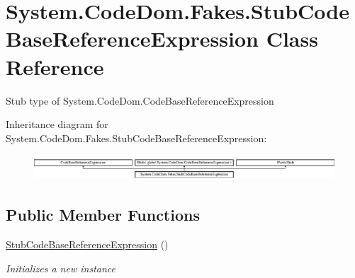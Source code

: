 \hypertarget{class_system_1_1_code_dom_1_1_fakes_1_1_stub_code_base_reference_expression}{\section{System.\-Code\-Dom.\-Fakes.\-Stub\-Code\-Base\-Reference\-Expression Class Reference}
\label{class_system_1_1_code_dom_1_1_fakes_1_1_stub_code_base_reference_expression}
}


Stub type of System.\-Code\-Dom.\-Code\-Base\-Reference\-Expression 


Inheritance diagram for System.\-Code\-Dom.\-Fakes.\-Stub\-Code\-Base\-Reference\-Expression\-:\begin{figure}[H]
\begin{center}
\leavevmode
\includegraphics[height=0.952381cm]{class_system_1_1_code_dom_1_1_fakes_1_1_stub_code_base_reference_expression}
\end{center}
\end{figure}
\subsection*{Public Member Functions}
\begin{DoxyCompactItemize}
\item 
\hyperlink{class_system_1_1_code_dom_1_1_fakes_1_1_stub_code_base_reference_expression_ac70619826cdb24a51b0c92afc4907b54}{Stub\-Code\-Base\-Reference\-Expression} ()
\begin{DoxyCompactList}\small\item\em Initializes a new instance\end{DoxyCompactList}\end{DoxyCompactItemize}
